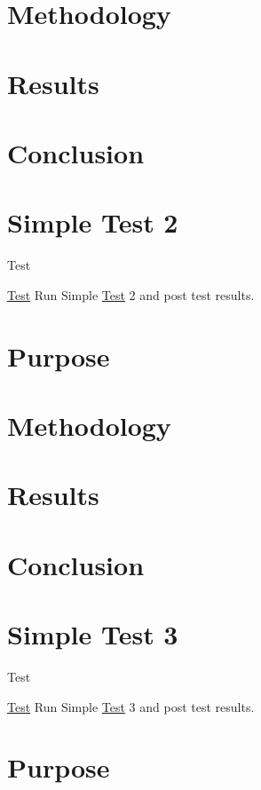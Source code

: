 \section*{Methodology}

\section*{Results}

\section*{Conclusion}\hypertarget{SimpleTest2}{}\section{Simple Test 2}\label{SimpleTest2}
\begin{DoxyRefDesc}{Test}
\item[\hyperlink{test__test000006}{Test}]Run Simple \hyperlink{class_test}{Test} 2 and post test results.\end{DoxyRefDesc}


\section*{Purpose}

\section*{Methodology}

\section*{Results}

\section*{Conclusion}\hypertarget{SimpleTest3}{}\section{Simple Test 3}\label{SimpleTest3}
\begin{DoxyRefDesc}{Test}
\item[\hyperlink{test__test000007}{Test}]Run Simple \hyperlink{class_test}{Test} 3 and post test results.\end{DoxyRefDesc}


\section*{Purpose}

